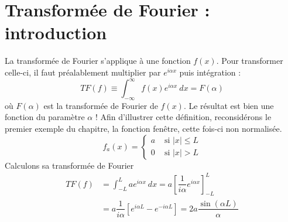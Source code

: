 \newpage
\section{Transformée de Fourier : introduction}
La transformée de Fourier s'applique à une fonction $f(x)$. Pour transformer celle-ci, il 
faut préalablement multiplier par $e^{i\alpha x}$ puis intégration :
\begin{equation}
TF(f) \equiv \int_{-\infty}^\infty f(x)e^{i\alpha x}\ dx = F(\alpha)
\end{equation}
où $F(\alpha)$ est la transformée de Fourier de $f(x)$. Le résultat est bien une fonction 
du paramètre $\alpha$ ! Afin d'illustrer cette définition, reconsidérons le premier exemple 
du chapitre, la fonction fenêtre, cette fois-ci non normalisée.
\begin{equation}
f_a(x) =\left\{\begin{array}{ll}
a &\text{ si } |x| \leq L\\
0 &\text{ si } |x| > L
\end{array}\right.
\end{equation}
Calculons sa transformée de Fourier
\begin{equation}
\begin{array}{ll}
TF(f) &= \int_{-L}^L ae^{i\alpha x}\ dx = a\left[\dfrac{1}{i\alpha}e^{i\alpha x}\right]^L_{-L}\\
&= a\dfrac{1}{i\alpha}\left[e^{i\alpha L}-e^{-i\alpha L}\right] = 2a\dfrac{\sin(\alpha L)}{\alpha}
\end{array}
\end{equation}

